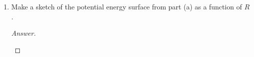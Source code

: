 \documentclass[../psets.tex]{subfiles}
\begin{document}
\begin{enumerate}
\begin{enumerate}
\begin{proof}[Answer]
\begin{equation*}
            \end{equation*}
            Additionally, we know that the first-order perturbation
            \begin{align*}
                \dv{E}{\lambda}\bigg|_0 &= \int\psi_0^*\hat{V}\psi_0\dd{\vec{r}}\\
                &= \int\dd{\vec{r}}1s_\text{A}^*\left( -\frac{1}{r_\text{B}}+\frac{1}{R} \right)1s_\text{A}\\
                &= J\\
                \Aboxed{\dv{E}{\lambda}\bigg|_0 &= \e[-2R]\left( 1+\frac{1}{R} \right)}
            \end{align*}
            Thus, the ground state potential energy surface is
            \begin{equation*}
                \boxed{E(1) = -\frac{1}{2}+\e[-2R]\left( 1+\frac{1}{R} \right)}
            \end{equation*}
        \end{proof}
        \item Make a sketch of the potential energy surface from part (a) as a function of $R$.
        \begin{proof}[Answer]
            ${\color{white}hi}$
            \begin{center}
\end{center}
\end{proof}
\end{enumerate}
\end{enumerate}
\end{document}
